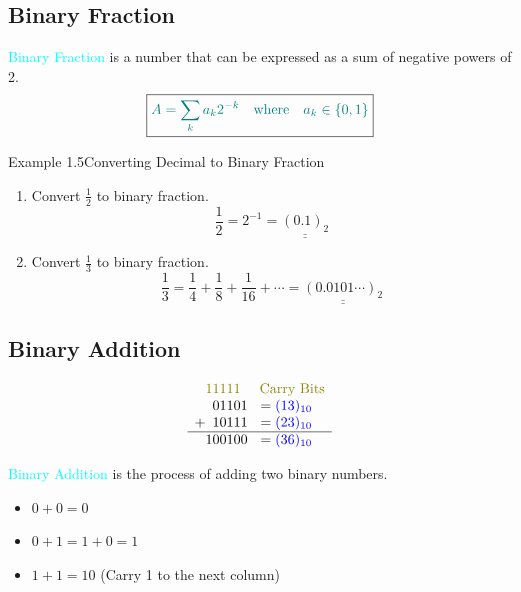\documentclass{book}
\begin{document}
\subsection{Binary Fraction}
\raggedright
\textcolor{cyan}{Binary Fraction} is a number that can be expressed as a sum of negative powers of 2.\\
\[
\boxed{\textcolor{teal}{A = \sum_k a_k 2^{-k} \quad \text{where} \quad a_k \in \{0, 1\}}}
\]
\begin{egBox}{Example 1.5}{Converting Decimal to Binary Fraction}
    \raggedright
    \begin{enumerate}
        \item Convert $\frac{1}{2}$ to binary fraction.\\
        \[
            \frac{1}{2} = 2^{-1} = \underline{\underline{(0.1)_2}}
        \]
        \item Convert $\frac{1}{3}$ to binary fraction.\\
        \[
            \frac{1}{3} = \frac{1}{4} + \frac{1}{8} + \frac{1}{16} + \cdots = \underline{\underline{(0.0101\cdots)_2}}
        \]
    \end{enumerate}
\end{egBox}
\subsection{Binary Addition}
\raggedright
\begin{figure}
    \[
    \begin{array}{c@{}c@{}c@{}c@{}c@{}c@{}c@{}c}
        & \textcolor{olive}{1} & \textcolor{olive}{1} & \textcolor{olive}{1} & \textcolor{olive}{1} & \textcolor{olive}{1} & & \hspace{3mm} \textcolor{olive}{\text{Carry Bits}}\\
        &  & 0 & 1 & 1 & 0 & 1 & = \textcolor{blue}{(13)_{10}}\\
        + &  & 1 & 0 & 1 & 1 & 1 & = \textcolor{blue}{(23)_{10}}\\
        \hline
        & 1 & 0 & 0 & 1 & 0 & 0 & = \textcolor{blue}{(36)_{10}}
    \end{array}
    \]
\end{figure}
\textcolor{cyan}{Binary Addition} is the process of adding two binary numbers.\\
\begin{itemize}
    \item \(0 + 0 = 0\)
    \item \(0 + 1 = 1 + 0 = 1\)
    \item \(1 + 1 = 10\) (Carry 1 to the next column)
\end{itemize}
\end{document}
